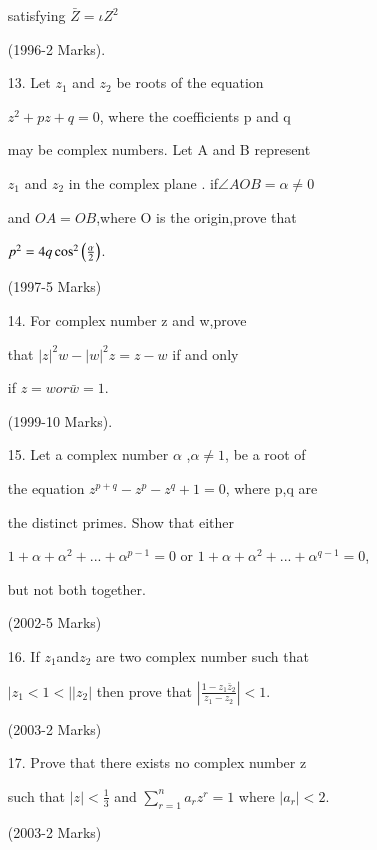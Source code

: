 \documentclass[journal,12pt,twocolumn]{IEEEtran}
\theoremstyle{remark}
\begin{document}
\begin{enumerate}
satisfying $\bar Z=\iota Z^2 $ 

\hfill(1996-2 Marks).\\

\item[13.] Let $z_1$ and $z_2$ be roots of the equation 

$z^2+pz+q=0$, where the coefficients p and q

may be complex numbers. Let A and B represent 

$z_1$ and $z_2$ in the complex plane . if$ \angle AOB = \alpha \not=0$ 

and $OA=OB$,where O is the origin,prove that 

$p^2=4q\cos^2\left(\frac{\alpha}{2}\right)$. 

\hfill(1997-5 Marks)\\

\item[14.] For complex number z and w,prove 

that $|z|^2w-|w|^2z=z- w$  if and only 

if $ z = w or \bar w = 1$.
   
   \hfill(1999-10 Marks).\\


\item[15.] Let a complex number $\alpha$ ,$\alpha \not=1$, be a root of 

the equation $z^{p+q}-z^p-z^q+1=0$, where p,q are 

the distinct primes. Show that either 

$1+\alpha+\alpha^2+...+\alpha^{p-1}=0$ or $1+\alpha+\alpha^2+...+\alpha^{q- 1}=0$,

but not both together. 

\hfill(2002-5 Marks)\\

\item[16.] If $z_1$and$z_2$ are two  complex number such that

     $|z_1<1<||z_2|$ then prove that $|\frac{1-z_1\bar z_2}{z_1-z_2}|<1.$ 
    
    \hfill(2003-2 Marks)\\

\item[17.] Prove that there exists no  complex number z 

      such that $|z|<\frac{1}{3}$ and  $\sum_{r=1}^{n} a_r z^r =1$ where $|a_r|<2$.
   
  
   \hfill (2003-2 Marks)\\
      

\end{enumerate}
\end{document}
